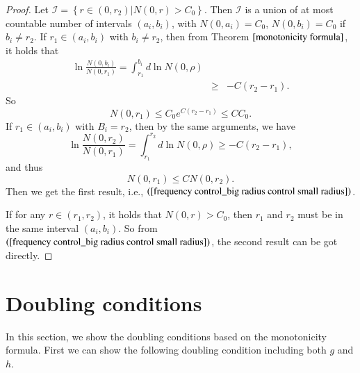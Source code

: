 \documentclass[a4paper, 12pt, onecolumn]{article} \textwidth 148mm
\begin{document}
\begin{proof}
Let $\mathcal{I}=\left\{r\in(0,r_2)|N(0,r)>C_0\right\}$. Then $\mathcal{I}$ is a union of at most countable number of intervals $(a_i,b_i)$, with $N(0,a_i)=C_0$, $N(0,b_i)=C_0$ if $b_i\neq r_2$.  If $r_1\in (a_i,b_i)$ with $b_i\neq r_2$, then from Theorem $\ref{monotonicity formula}$, it holds that
\begin{eqnarray*}
\ln\frac{N(0,b_i)}{N(0,r_1)}=\int_{r_1}^{b_i}d\ln N(0,\rho)\\&\geq&-C(r_2-r_1).
\end{eqnarray*}
So
\begin{equation*}
N(0,r_1)\leq C_0e^{C(r_2-r_1)}\leq CC_0.
\end{equation*}
If $r_1\in(a_i,b_i)$ with $B_i=r_2$, then by the same arguments, we have
\begin{equation}\label{integrate monotonicity formula}
\ln\frac{N(0,r_2)}{N(0,r_1)}=\int_{r_1}^{r_2}d\ln N(0,\rho)\geq-C(r_2-r_1),
\end{equation}
and thus
\begin{equation*}
N(0,r_1)\leq CN(0,r_2).
\end{equation*}
Then we get the first result, i.e., $(\ref{frequency control_big radius control small radius})$.

If for any $r\in(r_1,r_2)$, it holds that $N(0,r)>C_0$, then $r_1$ and $r_2$ must be in the same interval $(a_i,b_i)$. So from $(\ref{frequency control_big radius control small radius})$, the second result can be got directly.
\end{proof}

\section{Doubling conditions}

In this section, we show the doubling conditions based on the monotonicity formula. First we can  show the following doubling condition including both $g$ and $h$.
\end{document}
